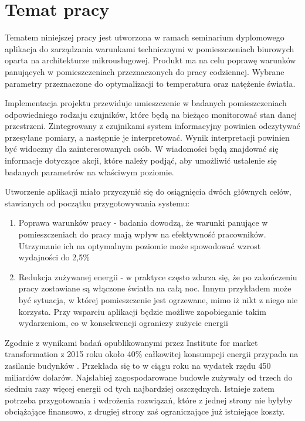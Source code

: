 \newpage %
\section{Temat pracy}

Tematem niniejszej pracy jest utworzona w ramach seminarium dyplomowego aplikacja do 
zarządzania warunkami technicznymi w pomieszczeniach biurowych oparta na architekturze 
mikrousługowej. Produkt ma na celu poprawę warunków panujących w pomieszczeniach 
przeznaczonych do pracy codziennej. Wybrane parametry przeznaczone do optymalizacji to 
temperatura oraz natężenie światła.

Implementacja projektu przewiduje umieszczenie w badanych pomieszczeniach odpowiedniego 
rodzaju czujników, które będą na bieżąco monitorować stan danej przestrzeni. 
Zintegrowany z czujnikami system informacyjny powinien odczytywać przesyłane 
pomiary, a następnie je interpretować. Wynik interpretacji powinien być widoczny dla 
zainteresowanych osób. W wiadomości będą znajdować się informacje dotyczące 
akcji, które należy podjąć, aby umożliwić ustalenie się badanych parametrów na 
właściwym poziomie.

Utworzenie aplikacji miało przyczynić się do osiągnięcia dwóch głównych 
celów, stawianych od początku przygotowywania systemu:

\begin{enumerate}
    \item Poprawa warunków pracy - badania \cite{oseland2012} dowodzą, że 
    warunki panujące w pomieszczeniach do pracy mają wpływ na efektywność pracowników. 
    Utrzymanie ich na optymalnym poziomie może spowodować wzrost wydajności do 2,5\%
    \item Redukcja zużywanej energii - w praktyce często zdarza się, że po zakończeniu 
    pracy zostawiane są włączone światła na całą noc. Innym przykładem może być 
    sytuacja, w której pomieszczenie jest ogrzewane, mimo iż nikt z niego nie korzysta. 
    Przy wsparciu aplikacji będzie możliwe zapobieganie takim wydarzeniom, co w 
    konsekwencji ograniczy zużycie energii
\end{enumerate}

Zgodnie z wynikami badań opublikowanymi przez Institute for market transformation z 
2015 roku około 40\% całkowitej konsumpcji energii przypada na zasilanie budynków 
\cite{Imt.org2015}. Przekłada się to w ciągu roku na wydatek rzędu 450 miliardów 
dolarów. Najsłabiej zagospodarowane budowle zużywały od trzech do siedmiu razy więcej 
energii od tych najbardziej oszczędnych. Istnieje zatem potrzeba przygotowania 
i wdrożenia rozwiązań, które z jednej strony nie byłyby obciążające finansowo, z 
drugiej strony zaś ograniczające już istniejące koszty. 
